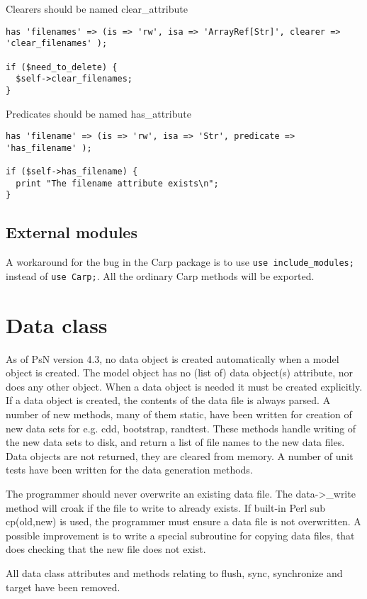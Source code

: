 Clearers should be named clear\_attribute
\begin{verbatim}
has 'filenames' => (is => 'rw', isa => 'ArrayRef[Str]', clearer => 'clear_filenames' );

if ($need_to_delete) {
  $self->clear_filenames;
}
\end{verbatim}

Predicates should be named has\_attribute
\begin{verbatim}
has 'filename' => (is => 'rw', isa => 'Str', predicate => 'has_filename' );

if ($self->has_filename) {
  print "The filename attribute exists\n";
}
\end{verbatim}

\subsection{External modules}

A workaround for the bug in the Carp package is to use \verb|use include_modules;| instead of \verb|use Carp;|. All the ordinary Carp methods will be exported.


\section{Data class}
As of PsN version 4.3, no data object is created automatically when a model object is created.
The model object has no (list of) data object(s) attribute, nor does any other object.
When a data object is needed it must be created explicitly. If a data object is created, the contents of the
data file is always parsed. A number of new methods, many of them
static, have been written for creation of new data sets for e.g. cdd, bootstrap, randtest. 
These methods handle writing of the new data sets to disk, and return a list of file names to the
new data files. Data objects are not returned, they are cleared from memory. A number of unit tests have been written for
the data generation methods.

The programmer should never overwrite 
an existing data file.
The data->\_write method will croak if the file to write to already exists. If built-in Perl sub cp(old,new) is
used, the programmer must ensure a data file is not overwritten. A possible improvement is to write a special subroutine
for copying data files, that does checking that the new file does not exist.

All data class attributes and methods relating to flush, sync, synchronize and target have been removed. 

